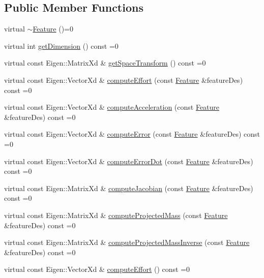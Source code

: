 \subsection*{Public Member Functions}
\begin{DoxyCompactItemize}
\item 
virtual \hyperlink{classocra_1_1Feature_ac586ef442048720b70662fed9bdf3e82}{$\sim$\+Feature} ()=0
\item 
virtual int \hyperlink{classocra_1_1Feature_aeda4c2a5ffe638c3de30f8b91a11450e}{get\+Dimension} () const =0
\item 
virtual const Eigen\+::\+Matrix\+Xd \& \hyperlink{classocra_1_1Feature_a77eb324fb4da91fd50d0e761d2453ff3}{get\+Space\+Transform} () const =0
\item 
virtual const Eigen\+::\+Vector\+Xd \& \hyperlink{classocra_1_1Feature_a19626a241666fdae253af1f7b6f2acd7}{compute\+Effort} (const \hyperlink{classocra_1_1Feature}{Feature} \&feature\+Des) const =0
\item 
virtual const Eigen\+::\+Vector\+Xd \& \hyperlink{classocra_1_1Feature_a4a5973d27459d2dececec8dc73038df8}{compute\+Acceleration} (const \hyperlink{classocra_1_1Feature}{Feature} \&feature\+Des) const =0
\item 
virtual const Eigen\+::\+Vector\+Xd \& \hyperlink{classocra_1_1Feature_aaa74d6869f7e574fcc39d443581ddf77}{compute\+Error} (const \hyperlink{classocra_1_1Feature}{Feature} \&feature\+Des) const =0
\item 
virtual const Eigen\+::\+Vector\+Xd \& \hyperlink{classocra_1_1Feature_ac714181e1bb25f878349e299c4ba8c00}{compute\+Error\+Dot} (const \hyperlink{classocra_1_1Feature}{Feature} \&feature\+Des) const =0
\item 
virtual const Eigen\+::\+Matrix\+Xd \& \hyperlink{classocra_1_1Feature_a4fb8eeeed978a1f727ec43cd1bd18d78}{compute\+Jacobian} (const \hyperlink{classocra_1_1Feature}{Feature} \&feature\+Des) const =0
\item 
virtual const Eigen\+::\+Matrix\+Xd \& \hyperlink{classocra_1_1Feature_a44e11dd349e92971fefebff354e7214b}{compute\+Projected\+Mass} (const \hyperlink{classocra_1_1Feature}{Feature} \&feature\+Des) const =0
\item 
virtual const Eigen\+::\+Matrix\+Xd \& \hyperlink{classocra_1_1Feature_ac529096b3fe8eba1ab88a56d8b042d37}{compute\+Projected\+Mass\+Inverse} (const \hyperlink{classocra_1_1Feature}{Feature} \&feature\+Des) const =0
\item 
virtual const Eigen\+::\+Vector\+Xd \& \hyperlink{classocra_1_1Feature_ae43f2ffc54862d6ddc0b02fd39431eb6}{compute\+Effort} () const =0

\end{DoxyCompactItemize}
